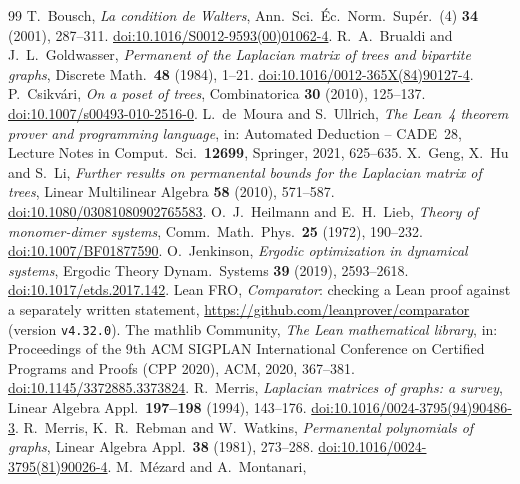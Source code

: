 \documentclass[11pt]{article}
\theoremstyle{definition}
\begin{document}
\begin{thebibliography}{99}
 T.~Bousch,
\emph{La condition de Walters},
Ann.\ Sci.\ \'Ec.\ Norm.\ Sup\'er.\ (4) \textbf{34} (2001), 287--311.
\href{https://doi.org/10.1016/S0012-9593(00)01062-4}{doi:10.1016/S0012-9593(00)01062-4}.
 R.~A.~Brualdi and J.~L.~Goldwasser,
\emph{Permanent of the Laplacian matrix of trees and bipartite graphs},
Discrete Math.\ \textbf{48} (1984), 1--21.
\href{https://doi.org/10.1016/0012-365X(84)90127-4}{doi:10.1016/0012-365X(84)90127-4}.
 P.~Csikv\'ari,
\emph{On a poset of trees},
Combinatorica \textbf{30} (2010), 125--137.
\href{https://doi.org/10.1007/s00493-010-2516-0}{doi:10.1007/s00493-010-2516-0}.
 L.~de~Moura and S.~Ullrich,
\emph{The Lean~4 theorem prover and programming language},
in: Automated Deduction -- CADE~28, Lecture Notes in Comput.\ Sci.\ \textbf{12699}, Springer, 2021,
625--635.
 X.~Geng, X.~Hu and S.~Li,
\emph{Further results on permanental bounds for the Laplacian matrix of trees},
Linear Multilinear Algebra \textbf{58} (2010), 571--587.
\href{https://doi.org/10.1080/03081080902765583}{doi:10.1080/03081080902765583}.
 O.~J.~Heilmann and E.~H.~Lieb,
\emph{Theory of monomer-dimer systems},
Comm.\ Math.\ Phys.\ \textbf{25} (1972), 190--232.
\href{https://doi.org/10.1007/BF01877590}{doi:10.1007/BF01877590}.
 O.~Jenkinson,
\emph{Ergodic optimization in dynamical systems},
Ergodic Theory Dynam.\ Systems \textbf{39} (2019), 2593--2618.
\href{https://doi.org/10.1017/etds.2017.142}{doi:10.1017/etds.2017.142}.
 Lean FRO, \emph{Comparator}: checking a Lean proof against a separately written
statement, \url{https://github.com/leanprover/comparator} (version \texttt{v4.32.0}).
 The mathlib Community,
\emph{The Lean mathematical library},
in: Proceedings of the 9th ACM SIGPLAN International Conference on Certified Programs and Proofs
(CPP 2020), ACM, 2020, 367--381.
\href{https://doi.org/10.1145/3372885.3373824}{doi:10.1145/3372885.3373824}.
 R.~Merris,
\emph{Laplacian matrices of graphs: a survey},
Linear Algebra Appl.\ \textbf{197--198} (1994), 143--176.
\href{https://doi.org/10.1016/0024-3795(94)90486-3}{doi:10.1016/0024-3795(94)90486-3}.
 R.~Merris, K.~R.~Rebman and W.~Watkins,
\emph{Permanental polynomials of graphs},
Linear Algebra Appl.\ \textbf{38} (1981), 273--288.
\href{https://doi.org/10.1016/0024-3795(81)90026-4}{doi:10.1016/0024-3795(81)90026-4}.
 M.~M\'ezard and A.~Montanari,

\end{thebibliography}
\end{document}
